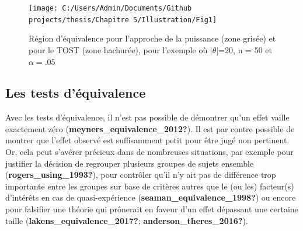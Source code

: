\documentclass[
  english,
  man]{apa6}
\begin{document}
\begin{figure}

{\centering \texttt{[image: C:/Users/Admin/Documents/Github projects/thesis/Chapitre 5/Illustration/Fig1]} 

}

\caption{Région d'équivalence pour l'approche de la puissance (zone grisée) et pour le TOST (zone hachurée), pour l'exemple où $|\theta$|=20, n = 50 et $\alpha=.05$}\label{fig:schuirman2}
\end{figure}

\newpage

\hypertarget{les-tests-duxe9quivalence}{%
\subsection{Les tests d'équivalence}\label{les-tests-duxe9quivalence}}

Avec les tests d'équivalence, il n'est pas possible de démontrer qu'un effet vaille exactement zéro (\textbf{meyners\_equivalence\_2012?}). Il est par contre possible de montrer que l'effet observé est suffisamment petit pour être jugé non pertinent. Or, cela peut s'avérer précieux dans de nombreuses situations, par exemple pour justifier la décision de regrouper plusieurs groupes de sujets ensemble (\textbf{rogers\_using\_1993?}), pour contrôler qu'il n'y ait pas de différence trop importante entre les groupes sur base de critères autres que le (ou les) facteur(s) d'intérêts en cas de quasi-expérience (\textbf{seaman\_equivalence\_1998?}) ou encore pour falsifier une théorie qui prônerait en faveur d'un effet dépassant une certaine taille (\textbf{lakens\_equivalence\_2017?}; \textbf{anderson\_theres\_2016?}).
\end{document}
